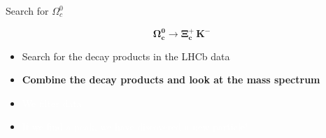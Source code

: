 \begin{frame}{Search for $\Omega_c^0$}

  \begin{center} \vspace{-1cm}
 \Large    \[\mathbf{\Omega_c^0 \rightarrow \Xi_c^+ \, K^-}\]
 \end{center}
   \begin{spacing}{1.5}
       
  
    \begin{itemize}    \item[\ding{202}] Search for the decay products in the LHCb data 
    \item[\ding{203}]\textbf {Combine the decay products and look at the mass spectrum }
        \item[] \textcolor{white}{We filter data}
    \item[] \textcolor{white}{If we find a peak, we have discovered a new particle! }
\end{itemize}
 \end{spacing}

\end{frame}

